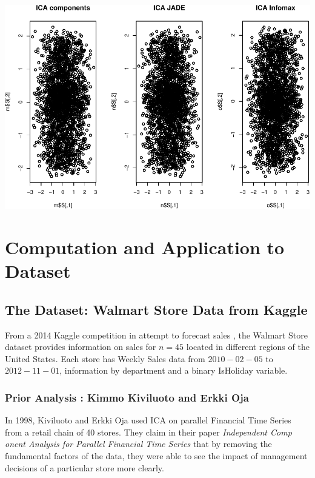 \documentclass[12pt,twoside]{amherstthesis}
\begin{document}
  \begin{center}\includegraphics{ICA_Stats_Comps_files/figure-latex/unnamed-chunk-8-2} \end{center}
  
  \chapter{Computation and Application to
  Dataset}\label{computation-and-application-to-dataset}
  
  \section{The Dataset: Walmart Store Data from
  Kaggle}\label{the-dataset-walmart-store-data-from-kaggle}
  
  From a 2014 Kaggle competition in attempt to forecast sales , the
  Walmart Store dataset provides information on sales for \(n=45\) located
  in different regions of the United States. Each store has Weekly Sales
  data from \(2010-02-05\) to \(2012-11-01\), information by department
  and a binary IsHoliday variable.
  
  \subsection{Prior Analysis : Kimmo Kiviluoto and Erkki
  Oja}\label{prior-analysis-kimmo-kiviluoto-and-erkki-oja}
  
  In 1998, Kiviluoto and Erkki Oja used ICA on parallel Financial Time
  Series from a retail chain of 40 stores. They claim in their paper
  \textit{Independent Comp onent Analysis for Parallel Financial Time Series}
  that by removing the fundamental factors of the data, they were able to
  see the impact of management decisions of a particular store more
  clearly.
  
\end{document}
